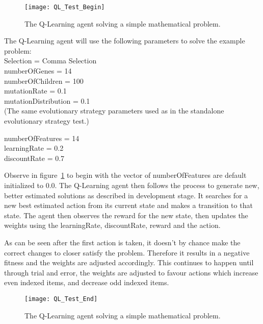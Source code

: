\documentclass{report}
\begin{document}
\begin{figure}
\centerline{\texttt{[image: QL\_Test\_Begin]}}
\caption[Q-learning Test: Console Output Start]{}
\label{fgr:qltcos}
\centerline{The Q-Learning agent solving a simple mathematical problem.}
\end{figure}

The Q-Learning agent will use the following parameters to solve the example problem:\\
Selection = Comma Selection\\
numberOfGenes = 14\\
numberOfChildren = 100\\
mutationRate = 	0.1\\
mutationDistribution = 0.1\\
(The same evolutionary strategy parameters used as in the standalone evolutionary strategy test.)

numberOfFeatures = 14\\
learningRate = 0.2\\
discountRate = 0.7

Observe in figure~\ref{fgr:qltcos} to begin with the vector of numberOfFeatures are default initialized to 0.0. The Q-Learning agent then follows the process to generate new, 
better estimated solutions as described in development stage. It searches for a new best estimated action from its current state and makes a transition to that state. The agent then observes 
the reward for the new state, then updates the weights using the learningRate, discountRate, reward and the action.

As can be seen after the first action is taken, it doesn't by chance make the correct changes to closer satisfy the problem. Therefore it results in a negative fitness and the weights are adjusted accordingly.
This continues to happen until through trial and error, the weights are adjusted to favour actions which increase even indexed items, and decrease odd indexed items.

\begin{figure}
\centerline{\texttt{[image: QL\_Test\_End]}}
\caption[Q-learning Test: Console Output Finished]{}
\label{fgr:qltcof}
\centerline{The Q-Learning agent solving a simple mathematical problem.}
\end{figure}
\end{document}
